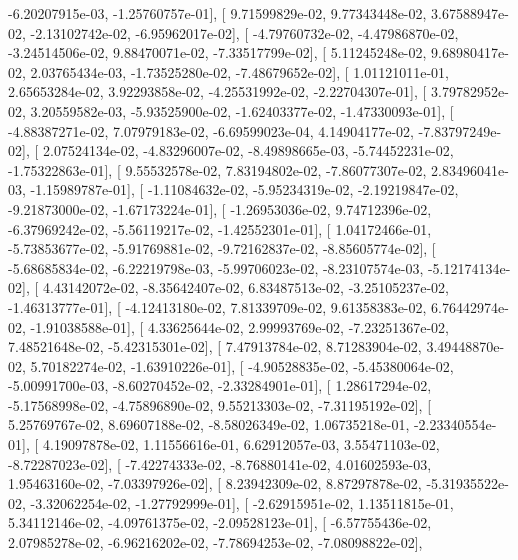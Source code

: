 \documentclass{article}
\begin{document}
         -6.20207915e-03,  -1.25760757e-01],
       [  9.71599829e-02,   9.77343448e-02,   3.67588947e-02,
         -2.13102742e-02,  -6.95962017e-02],
       [ -4.79760732e-02,  -4.47986870e-02,  -3.24514506e-02,
          9.88470071e-02,  -7.33517799e-02],
       [  5.11245248e-02,   9.68980417e-02,   2.03765434e-03,
         -1.73525280e-02,  -7.48679652e-02],
       [  1.01121011e-01,   2.65653284e-02,   3.92293858e-02,
         -4.25531992e-02,  -2.22704307e-01],
       [  3.79782952e-02,   3.20559582e-03,  -5.93525900e-02,
         -1.62403377e-02,  -1.47330093e-01],
       [ -4.88387271e-02,   7.07979183e-02,  -6.69599023e-04,
          4.14904177e-02,  -7.83797249e-02],
       [  2.07524134e-02,  -4.83296007e-02,  -8.49898665e-03,
         -5.74452231e-02,  -1.75322863e-01],
       [  9.55532578e-02,   7.83194802e-02,  -7.86077307e-02,
          2.83496041e-03,  -1.15989787e-01],
       [ -1.11084632e-02,  -5.95234319e-02,  -2.19219847e-02,
         -9.21873000e-02,  -1.67173224e-01],
       [ -1.26953036e-02,   9.74712396e-02,  -6.37969242e-02,
         -5.56119217e-02,  -1.42552301e-01],
       [  1.04172466e-01,  -5.73853677e-02,  -5.91769881e-02,
         -9.72162837e-02,  -8.85605774e-02],
       [ -5.68685834e-02,  -6.22219798e-03,  -5.99706023e-02,
         -8.23107574e-03,  -5.12174134e-02],
       [  4.43142072e-02,  -8.35642407e-02,   6.83487513e-02,
         -3.25105237e-02,  -1.46313777e-01],
       [ -4.12413180e-02,   7.81339709e-02,   9.61358383e-02,
          6.76442974e-02,  -1.91038588e-01],
       [  4.33625644e-02,   2.99993769e-02,  -7.23251367e-02,
          7.48521648e-02,  -5.42315301e-02],
       [  7.47913784e-02,   8.71283904e-02,   3.49448870e-02,
          5.70182274e-02,  -1.63910226e-01],
       [ -4.90528835e-02,  -5.45380064e-02,  -5.00991700e-03,
         -8.60270452e-02,  -2.33284901e-01],
       [  1.28617294e-02,  -5.17568998e-02,  -4.75896890e-02,
          9.55213303e-02,  -7.31195192e-02],
       [  5.25769767e-02,   8.69607188e-02,  -8.58026349e-02,
          1.06735218e-01,  -2.23340554e-01],
       [  4.19097878e-02,   1.11556616e-01,   6.62912057e-03,
          3.55471103e-02,  -8.72287023e-02],
       [ -7.42274333e-02,  -8.76880141e-02,   4.01602593e-03,
          1.95463160e-02,  -7.03397926e-02],
       [  8.23942309e-02,   8.87297878e-02,  -5.31935522e-02,
         -3.32062254e-02,  -1.27792999e-01],
       [ -2.62915951e-02,   1.13511815e-01,   5.34112146e-02,
         -4.09761375e-02,  -2.09528123e-01],
       [ -6.57755436e-02,   2.07985278e-02,  -6.96216202e-02,
         -7.78694253e-02,  -7.08098822e-02],
\end{document}
